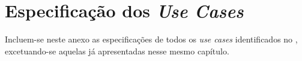 
\section{Especificação dos \emph{Use Cases}}
\label{ane:use-cases-spec}

Incluem-se neste anexo as especificações de todos os \emph{use cases} identificados no , excetuando-se aquelas já apresentadas nesse mesmo capítulo.












